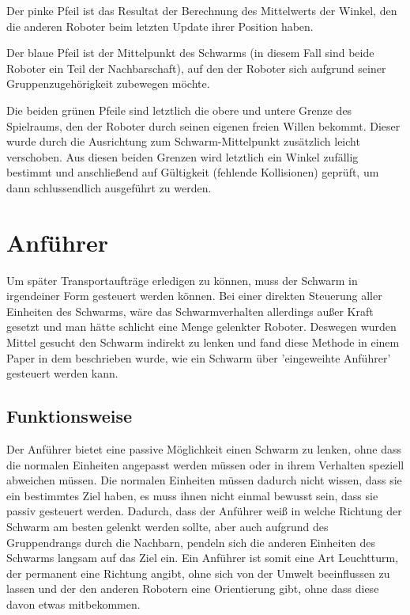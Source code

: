 Der pinke Pfeil ist das Resultat der Berechnung des Mittelwerts der Winkel, den die anderen Roboter beim letzten Update ihrer Position haben.

Der blaue Pfeil ist der Mittelpunkt des Schwarms (in diesem Fall sind beide Roboter ein Teil der Nachbarschaft), auf den der Roboter sich aufgrund seiner Gruppenzugehörigkeit zubewegen möchte.

Die beiden grünen Pfeile sind letztlich die obere und untere Grenze des Spielraums, den der Roboter durch seinen eigenen freien Willen bekommt. Dieser wurde durch die Ausrichtung zum Schwarm-Mittelpunkt zusätzlich leicht verschoben. Aus diesen beiden Grenzen wird letztlich ein Winkel zufällig bestimmt und anschließend auf Gültigkeit (fehlende Kollisionen) geprüft, um dann schlussendlich ausgeführt zu werden.



\section{Anführer}

Um später Transportaufträge erledigen zu können, muss der Schwarm in irgendeiner Form gesteuert werden können. Bei einer direkten Steuerung aller Einheiten des Schwarms, wäre das Schwarmverhalten allerdings außer Kraft gesetzt und man hätte schlicht eine Menge gelenkter Roboter. Deswegen wurden Mittel gesucht den Schwarm indirekt zu lenken und fand diese Methode in einem Paper in dem beschrieben wurde, wie ein Schwarm über 'eingeweihte Anführer' gesteuert werden kann.\cite{VicsekLeader2}

\subsection*{Funktionsweise}
Der Anführer bietet eine passive Möglichkeit einen Schwarm zu lenken, ohne dass die normalen Einheiten angepasst werden müssen oder in ihrem Verhalten speziell abweichen müssen. Die normalen Einheiten müssen dadurch nicht wissen, dass sie ein bestimmtes Ziel haben, es muss ihnen nicht einmal bewusst sein, dass sie passiv gesteuert werden. Dadurch, dass der Anführer weiß in welche Richtung der Schwarm am besten gelenkt werden sollte, aber auch aufgrund des Gruppendrangs durch die Nachbarn, pendeln sich die anderen Einheiten des Schwarms langsam auf das Ziel ein. Ein Anführer ist somit eine Art Leuchtturm, der permanent eine Richtung angibt, ohne sich von der Umwelt beeinflussen zu lassen und der den anderen Robotern eine Orientierung gibt, ohne dass diese davon etwas mitbekommen.

